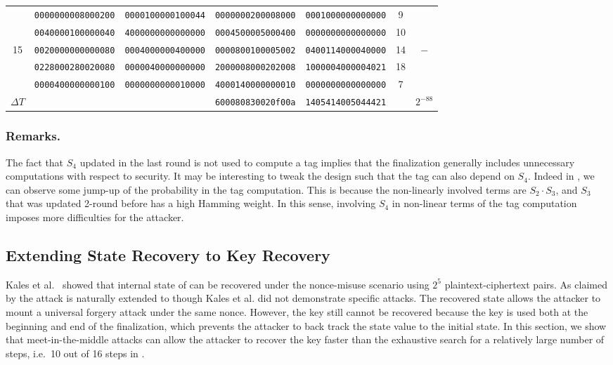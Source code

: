 \begin{table}[!tb]
\begin{center}
{\begin{tabular}{ccccccc}
      & {\tt 0000000008000200} & {\tt 0000100000100044} & {\tt 0000000200008000} & {\tt 0001000000000000} & 9  & \\
      & {\tt 0040000100000040} & {\tt 4000000000000000} & {\tt 0004500005000400} & {\tt 0000000000000000} & 10 & \\
15    & {\tt 0020000000000080} & {\tt 0004000000400000} & {\tt 0000800100005002} & {\tt 0400114000040000} & 14 & $-$\\
      & {\tt 0228000280020080} & {\tt 0000040000000000} & {\tt 2000008000202008} & {\tt 1000004000004021} & 18 & \\
      & {\tt 0000400000000100} & {\tt 0000000000010000} & {\tt 4000140000000010} & {\tt 0000000000000000} & 7  & \\ \hline

$\Delta T$ &                   &                        & {\tt 600080830020f00a} & {\tt 1405414005044421} & & $2^{-88}$ \\ \hline
\end{tabular}
}
\end{center}
\end{table}

\subsubsection{Remarks.} The fact that $S_4$ updated in the last round is not used to compute a tag implies that the \MORUS finalization generally includes unnecessary computations with respect to security. It may be interesting to tweak the design such that the tag can also depend on $S_4$. Indeed in , we can observe some jump-up of the probability in the tag computation. This is because the non-linearly involved terms are $S_2 \cdot S_3$, and $S_3$ that was updated 2-round before has a high Hamming weight. In this sense, involving $S_4$ in non-linear terms of the tag computation imposes more difficulties for the attacker.




\subsection{Extending State Recovery to Key Recovery}
\label{subsec/Ini}
Kales et al.~\cite{cryptoeprint:2017:1137} showed that internal state of \MORUS[640] can be recovered under the nonce-misuse scenario using $2^5$ plaintext-ciphertext pairs. As claimed by \cite{cryptoeprint:2017:1137} the attack is naturally extended to \MORUS[1280] though Kales et al. \cite{cryptoeprint:2017:1137} did not demonstrate specific attacks. The recovered state allows the attacker to mount a universal forgery attack under the same nonce. However, the key still cannot be recovered because the key is used both at the beginning and end of the finalization, which prevents the attacker to back track the state value to the initial state. In this section, we show that meet-in-the-middle attacks can allow the attacker to recover the key faster than the exhaustive search for a relatively large number of steps, i.e.~10 out of 16 steps in \MORUS[1280]. 

